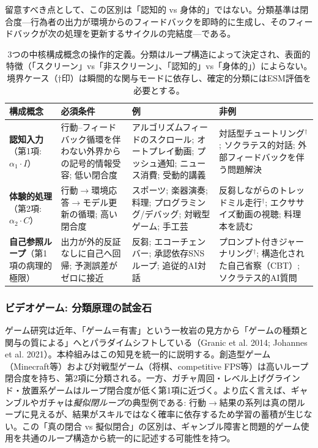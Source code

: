 \documentclass[a4paper,11pt,titlepage]{article}
\begin{document}
留意すべき点として、この区別は「認知的 vs 身体的」ではない。分類基準は閉合度---行為者の出力が環境からのフィードバックを即時的に生成し、そのフィードバックが次の処理を更新するサイクルの完結度---である。

\begin{table}[htbp]
\centering
\caption{3つの中核構成概念の操作的定義。分類はループ構造によって決定され、表面的特徴（「スクリーン」vs「非スクリーン」、「認知的」vs「身体的」）によらない。境界ケース（$\dagger$印）は瞬間的な関与モードに依存し、確定的分類にはESM評価を必要とする。}
\label{tab:operational-defs}
\small
\begin{tabular}{p{2.2cm}p{3.2cm}p{3.5cm}p{3.5cm}}
\toprule
\textbf{構成概念} & \textbf{必須条件} & \textbf{例} & \textbf{非例} \\
\midrule
\textbf{認知入力}（第1項: $\alpha_1 \cdot I$） &
  行動--フィードバック循環を伴わない外界からの記号的情報受容; 低い閉合度 &
  アルゴリズムフィードのスクロール; オートプレイ動画; プッシュ通知; ニュース消費; 受動的講義 &
  対話型チュートリング$^\dagger$; ソクラテス的対話; 外部フィードバックを伴う問題解決 \\
\addlinespace
\textbf{体験的処理}（第2項: $\alpha_2 \cdot C$） &
  行動$\to$環境応答$\to$モデル更新の循環; 高い閉合度 &
  スポーツ; 楽器演奏; 料理; プログラミング/デバッグ; 対戦型ゲーム; 手工芸 &
  反芻しながらのトレッドミル走行$^\dagger$; エクササイズ動画の視聴; 料理本を読む \\
\addlinespace
\textbf{自己参照ループ}（第1項の病理的極限） &
  出力が外的反証なしに自己へ回帰; 予測誤差がゼロに接近 &
  反芻; エコーチェンバー; 承認依存SNSループ; 追従的AI対話 &
  プロンプト付きジャーナリング$^\dagger$; 構造化された自己省察（CBT）; ソクラテス的AI質問 \\
\bottomrule
\end{tabular}
\end{table}

\subsubsection{ビデオゲーム: 分類原理の試金石}

ゲーム研究は近年、「ゲーム＝有害」という一枚岩の見方から「ゲームの種類と関与の質による」へとパラダイムシフトしている（Granic et al. 2014; Johannes et al. 2021）。本枠組みはこの知見を統一的に説明する。創造型ゲーム（Minecraft等）および対戦型ゲーム（将棋、competitive FPS等）は高いループ閉合度を持ち、第2項に分類される。一方、ガチャ周回・レベル上げグラインド・放置系ゲームはループ閉合度が低く第1項に近づく。より広く言えば、ギャンブルやガチャは\emph{擬似閉ループ}の典型例である: 行動$\to$結果の系列は真の閉ループに見えるが、結果がスキルではなく確率に依存するため学習の蓄積が生じない。この「真の閉合 vs 擬似閉合」の区別は、ギャンブル障害と問題的ゲーム使用を共通のループ構造から統一的に記述する可能性を持つ。
\end{document}
